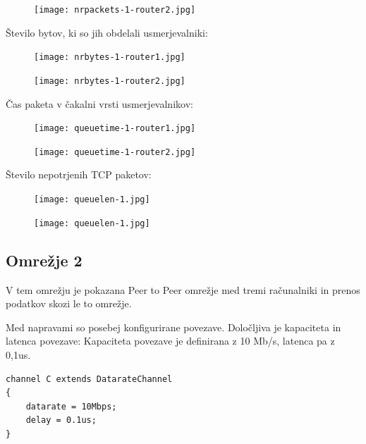 \documentclass[11pt,a4paper,slovene]{myarticle}
\begin{document}
\begin{figure}[h]
  \texttt{[image: nrpackets-1-router2.jpg]}
\end{figure}

Število bytov, ki so jih obdelali usmerjevalniki:

\begin{figure}[h]
  \texttt{[image: nrbytes-1-router1.jpg]}
\end{figure}

\begin{figure}[h]
  \texttt{[image: nrbytes-1-router2.jpg]}
\end{figure}

Čas paketa v čakalni vrsti usmerjevalnikov:

\begin{figure}[h]
  \texttt{[image: queuetime-1-router1.jpg]}
\end{figure}

\begin{figure}[h]
  \texttt{[image: queuetime-1-router2.jpg]}
\end{figure}

Število nepotrjenih TCP paketov:


\begin{figure}[h]
  \texttt{[image: queuelen-1.jpg]}
\end{figure}

\begin{figure}[h]
  \texttt{[image: queuelen-1.jpg]}
\end{figure}






\subsection{Omrežje 2}
V tem omrežju je pokazana Peer to Peer omrežje med tremi računalniki in prenos podatkov skozi le to omrežje. 

Med napravami so posebej konfigurirane povezave. Določljiva je kapaciteta in latenca povezave:
Kapaciteta povezave je definirana z 10 Mb/s, latenca pa z 0,1us.

\begin{lstlisting}
channel C extends DatarateChannel
{
    datarate = 10Mbps;
    delay = 0.1us;
}
\end{lstlisting}
\end{document}
